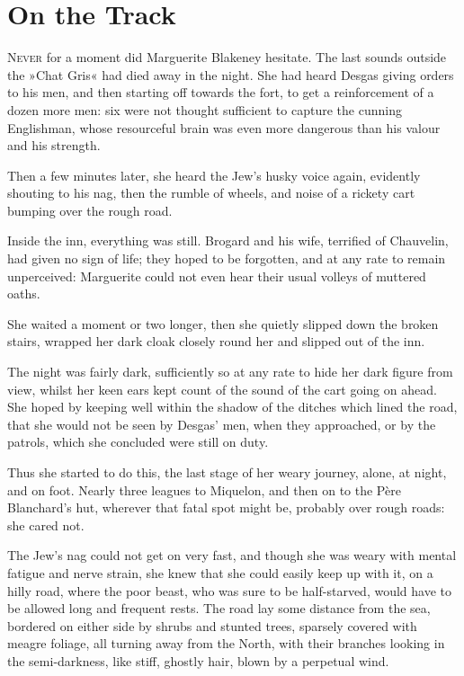 
\chapter{On the Track}
\lettrine[lines=4]{N}{ever} for a moment did Marguerite Blakeney hesitate. The last sounds outside the »Chat Gris« had died away in the night. She had heard Desgas giving orders to his men, and then starting off towards the fort, to get a reinforcement of a dozen more men: six were not thought sufficient to capture the cunning Englishman, whose resourceful brain was even more dangerous than his valour and his strength.

Then a few minutes later, she heard the Jew's husky voice again, evidently shouting to his nag, then the rumble of wheels, and noise of a rickety cart bumping over the rough road.

Inside the inn, everything was still. Brogard and his wife, terrified of Chauvelin, had given no sign of life; they hoped to be forgotten, and at any rate to remain unperceived: Marguerite could not even hear their usual volleys of muttered oaths.

She waited a moment or two longer, then she quietly slipped down the broken stairs, wrapped her dark cloak closely round her and slipped out of the inn.

The night was fairly dark, sufficiently so at any rate to hide her dark figure from view, whilst her keen ears kept count of the sound of the cart going on ahead. She hoped by keeping well within the shadow of the ditches which lined the road, that she would not be seen by Desgas' men, when they approached, or by the patrols, which she concluded were still on duty.

Thus she started to do this, the last stage of her weary journey, alone, at night, and on foot. Nearly three leagues to Miquelon, and then on to the Père Blanchard's hut, wherever that fatal spot might be, probably over rough roads: she cared not.

The Jew's nag could not get on very fast, and though she was weary with mental fatigue and nerve strain, she knew that she could easily keep up with it, on a hilly road, where the poor beast, who was sure to be half-starved, would have to be allowed long and frequent rests. The road lay some distance from the sea, bordered on either side by shrubs and stunted trees, sparsely covered with meagre foliage, all turning away from the North, with their branches looking in the semi-darkness, like stiff, ghostly hair, blown by a perpetual wind.

